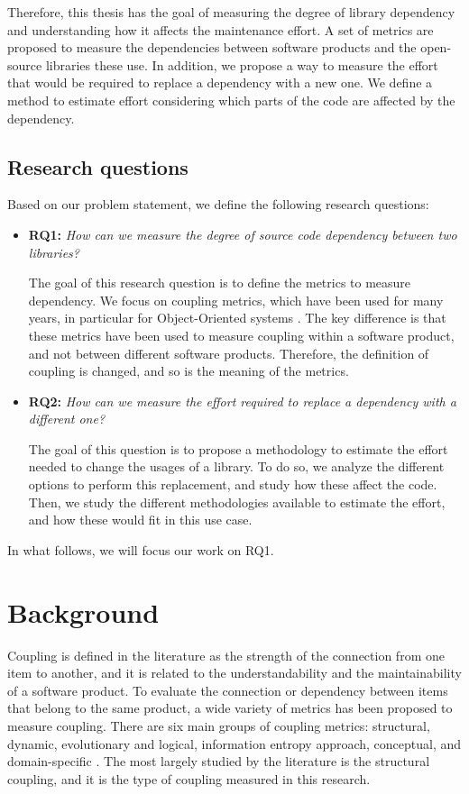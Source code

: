\documentclass[a4paper]{article}
\begin{document}
Therefore, this thesis has the goal of measuring the degree of library dependency and understanding how it affects the maintenance effort. A set of metrics are proposed to measure the dependencies between software products and the open-source libraries these use. In addition, we propose a way to measure the effort that would be required to replace a dependency with a new one. We define a method to estimate effort considering which parts of the code are affected by the dependency.

\subsection{Research questions}
Based on our problem statement, we define the following research questions:

\begin{itemize}
  \item \textbf{RQ1:} \textit{How can we measure the degree of source code dependency between two libraries?}

  The goal of this research question is to define the metrics to measure dependency. We focus on coupling metrics, which have been used for many years, in particular for Object-Oriented systems \cite{briand1999unified}. The key difference is that these metrics have been used to measure coupling within a software product, and not between different software products. Therefore, the definition of coupling is changed, and so is the meaning of the metrics.

  \item \textbf{RQ2:} \textit{How can we measure the effort required to replace a dependency with a different one?}

  The goal of this question is to propose a methodology to estimate the effort needed to change the usages of a library. To do so, we analyze the different options to perform this replacement, and study how these affect the code. Then, we study the different methodologies available to estimate the effort, and how these would fit in this use case.
\end{itemize}

In what follows, we will focus our work on RQ1.

\section{Background}\label{section:Background}
Coupling is defined in the literature as the strength of the connection from one item to another, and it is related to the understandability and the maintainability of a software product. To evaluate the connection or dependency between items that belong to the same product, a wide variety of metrics has been proposed to measure coupling.
There are six main groups of coupling metrics: structural, dynamic, evolutionary and logical, information entropy approach, conceptual, and domain-specific  \cite{poshyvanyk2006conceptual}. The most largely studied by the literature is the structural coupling, and it is the type of coupling measured in this research.
\end{document}

